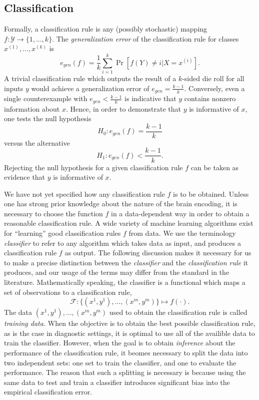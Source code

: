 \documentclass{article}
\begin{document}
\subsection{Classification}

Formally, a classification rule is
any (possibly stochastic) mapping $f: \mathcal{Y} \to \{1,\hdots,
k\}$.  The \emph{generalization error} of the classification rule for classes $x^{(1)},\hdots, x^{(k)}$ is
\[
e_{gen}(f) = \frac{1}{k} \sum_{i=1}^k\Pr[f(Y) \neq i | X = x^{(i)}].
\]
A trivial classification rule which outputs the result of a $k$-sided
die roll for all inputs $y$ would achieve a generalization error of
$e_{gen} = \frac{k-1}{k}$.  Conversely, even a single counterexample
with $e_{gen} < \frac{k-1}{k}$ is indicative that $y$ contains nonzero
information about $x$.  Hence, in order to demonstrate that $y$ is
informative of $x$, one tests the null hypothesis
\[
H_0: e_{gen}(f) = \frac{k-1}{k}
\]
versus the alternative
\[
H_1: e_{gen}(f) < \frac{k-1}{k}.
\]
Rejecting the null hypothesis for a given classification rule $f$ can
be taken as evidence that $y$ is informative of $x$.

We have not yet specified how any classification rule $f$ is to be
obtained.  Unless one has strong prior knowledge about the nature of
the brain encoding, it is necessary to choose the function $f$ in a
data-dependent way in order to obtain a reasonable classification
rule.  A wide variety of machine learning algorithms exist for
``learning'' good classification rules $f$ from data.  We use the
terminology \emph{classifier} to refer to any algorithm which takes
data as input, and produces a classification rule $f$ as output.  The
following discussion makes it necessary for us to make a precise
distinction between the \emph{classifier} and the \emph{classification
rule} it produces, and our usage of the terms may differ from the
standard in the literature.  Mathematically speaking, the classifier
is a functional which maps a set of observations to a classification
rule,
\[
\mathcal{F}: \{(x^{1},y^{1}),\hdots, (x^{m}, y^{m})\} \mapsto f(\cdot).
\]
The data $(x^1,y^1),\hdots, (x^m, y^m)$ used to obtain the
classification rule is called \emph{training data.}  When the
objective is to obtain the best possible classification rule, as is
the case in diagnostic settings, it is optimal to use all of the
availible data to train the classifier.  However, when the goal is to
obtain \emph{inference} about the performance of the classification
rule, it beomes necessary to split the data into two independent sets:
one set to train the classifier, and one to evaluate the performance.
The reason that such a splitting is necessary is because using the
same data to test and train a classifier introduces significant bias
into the empirical classification error.
\end{document}
